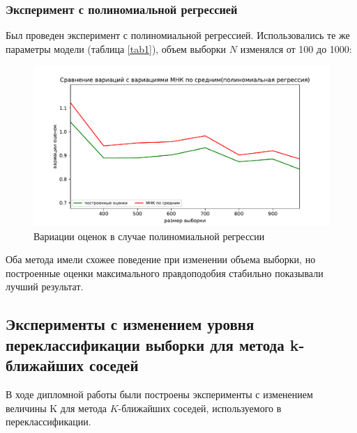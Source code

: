 \subsubsection{Эксперимент с полиномиальной регрессией}
Был проведен эксперимент с полиномиальной регрессией. Использовались те же параметры модели (таблица \ref{tab1}), объем выборки $N$ изменялся от 100 до 1000:
\begin{figure}[h!]
    \centering
    \includegraphics[width=150mm]{../images/polynomial.pdf}
    \caption{Вариации оценок в случае полиномиальной регрессии\label{overflow}}
    \label{pic3}
\end{figure}

Оба метода имели схожее поведение при изменении объема выборки, но построенные оценки максимального правдоподобия стабильно показывали лучший результат.

\subsection{Эксперименты с изменением уровня переклассификации выборки для метода k-ближайших соседей}\label{ss3_3_1}
В ходе дипломной работы были построены эксперименты с изменением величины K для метода $K$-ближайших соседей, используемого в переклассификации.  


